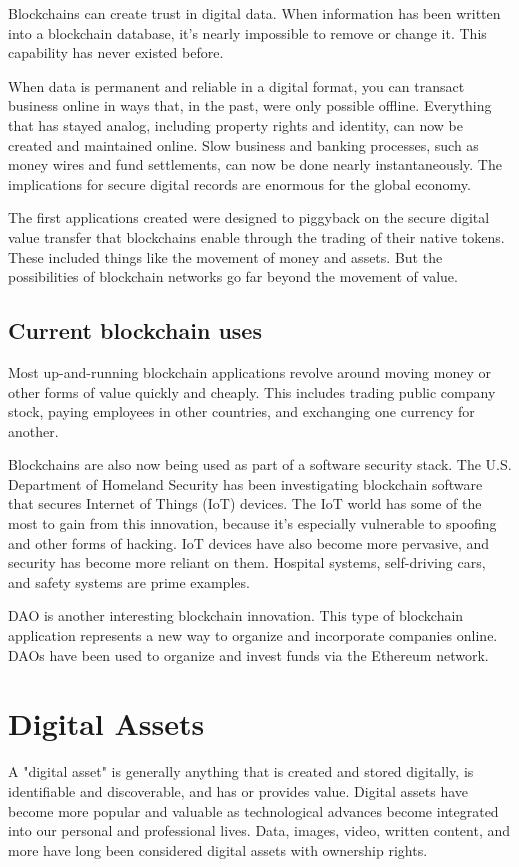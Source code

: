 \documentclass[MSE,Master,english]{twbook}%
\begin{document}
Blockchains can create trust in digital data. When information has been written into a blockchain database, it's nearly impossible to remove or change it. This capability has never existed before. 

When data is permanent and reliable in a digital format, you can transact business online in ways that, in the past, were only possible offline. Everything that has stayed analog, including property rights and identity, can now be created and maintained online. Slow business and banking processes, such as money wires and fund settlements, can now be done nearly instantaneously. The implications for secure digital records are enormous for the global economy. 

The first applications created were designed to piggyback on the secure digital value transfer that blockchains enable through the trading of their native tokens. These included things like the movement of money and assets. But the possibilities of blockchain networks go far beyond the movement of value.

\subsection{Current blockchain uses}

Most up-and-running blockchain applications revolve around moving money or other forms of value quickly and cheaply. This includes trading public company stock, paying employees in other countries, and exchanging one currency for another.\cite{blockchainDummies}

Blockchains are also now being used as part of a software security stack. The U.S. Department of Homeland Security has been investigating blockchain software that secures Internet of Things (\gls{IoT}) devices. The \gls{IoT} world has some of the most to gain from this innovation, because it's especially vulnerable to spoofing and other forms of hacking. \gls{IoT} devices have also become more pervasive, and security has become more reliant on them. Hospital systems, self-driving cars, and safety systems are prime examples. 

\ac{DAO} is another interesting blockchain innovation. This type of blockchain application represents a new way to organize and incorporate companies online. DAOs have been used to organize and invest funds via the Ethereum network.

\section{Digital Assets}
A "digital asset"\cite{digAssets} is generally anything that is created and stored digitally, is identifiable and discoverable, and has or provides value. Digital assets have become more popular and valuable as technological advances become integrated into our personal and professional lives. Data, images, video, written content, and more have long been considered digital assets with ownership rights.
\end{document}
